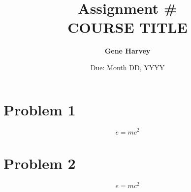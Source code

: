 \documentclass[10pt, letterpaper]{assignment-modern}
\title{Assignment \#\\\large{COURSE TITLE}}
\author{\textbf{Gene Harvey}}
\date{Due: Month DD, YYYY}
\begin{document}
	\maketitle
	
	\section*{Problem 1}
	\begin{problem}[hi]
		\lipsum*[4]
		\begin{equation*}
			e = mc^{2}
		\end{equation*}
	\end{problem}
	\begin{solution}
		\lipsum
	\end{solution}
	
	\section*{Problem 2}
	\begin{problem}
		\lipsum*[4]
		\begin{equation*}
			e = mc^{2}
		\end{equation*}
	\end{problem}
	\begin{solution}
		\lipsum
	\end{solution}
	
\end{document}

